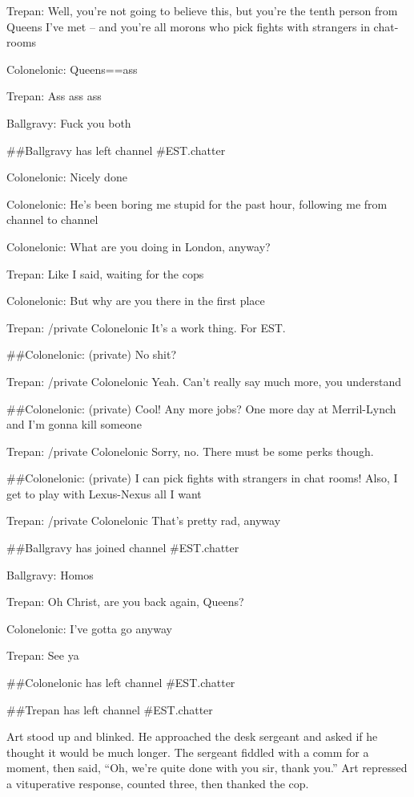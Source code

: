 {Trepan: Well, you're not going to believe this, but you're the
tenth person from Queens I've met -- and you're all morons who pick
fights with strangers in chat-rooms

Colonelonic: Queens==ass

Trepan: Ass ass ass

Ballgravy: Fuck you both

\#\#Ballgravy has left channel \#EST.chatter

Colonelonic: Nicely done

Colonelonic: He's been boring me stupid for the past hour,
following me from channel to channel

Colonelonic: What are you doing in London, anyway?

Trepan: Like I said, waiting for the cops

Colonelonic: But why are you there in the first place

Trepan: /private Colonelonic It's a work thing. For EST.

\#\#Colonelonic: (private) No shit?

Trepan: /private Colonelonic Yeah. Can't really say much more, you
understand

\#\#Colonelonic: (private) Cool! Any more jobs? One more day at
Merril-Lynch and I'm gonna kill someone

Trepan: /private Colonelonic Sorry, no. There must be some perks
though.

\#\#Colonelonic: (private) I can pick fights with strangers in chat
rooms! Also, I get to play with Lexus-Nexus all I want

Trepan: /private Colonelonic That's pretty rad, anyway

\#\#Ballgravy has joined channel \#EST.chatter

Ballgravy: Homos

Trepan: Oh Christ, are you back again, Queens?

Colonelonic: I've gotta go anyway

Trepan: See ya

\#\#Colonelonic has left channel \#EST.chatter

\#\#Trepan has left channel \#EST.chatter

}
\bigskip
Art stood up and blinked. He approached the desk sergeant and asked
if he thought it would be much longer. The sergeant fiddled with a
comm for a moment, then said, “Oh, we’re quite done with you sir,
thank you.” Art repressed a vituperative response, counted three,
then thanked the cop.


